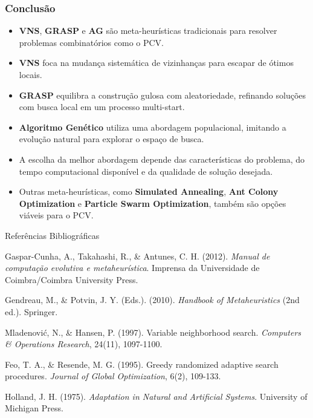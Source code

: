\documentclass{beamer}
\begin{document}
\begin{frame}
  \frametitle{Conclusão}
  
  \begin{itemize}
    \item \textbf{VNS}, \textbf{GRASP} e \textbf{AG} são meta-heurísticas tradicionais para resolver problemas combinatórios como o PCV.
    \item \textbf{VNS} foca na mudança sistemática de vizinhanças para escapar de ótimos locais.
    \item \textbf{GRASP} equilibra a construção gulosa com aleatoriedade, refinando soluções com busca local em um processo multi-start.
    \item \textbf{Algoritmo Genético} utiliza uma abordagem populacional, imitando a evolução natural para explorar o espaço de busca.
    \item A escolha da melhor abordagem depende das características do problema, do tempo computacional disponível e da qualidade de solução desejada.
    \item Outras meta-heurísticas, como \textbf{Simulated Annealing}, \textbf{Ant Colony Optimization} e \textbf{Particle Swarm Optimization}, também são opções viáveis para o PCV.
  \end{itemize}
  
\end{frame}


\begin{frame}{Referências Bibliográficas}
    \begin{thebibliography}{99}

    Gaspar-Cunha, A., Takahashi, R., \& Antunes, C. H. (2012). 
    \textit{Manual de computação evolutiva e metaheurística}. 
    Imprensa da Universidade de Coimbra/Coimbra University Press.

    Gendreau, M., \& Potvin, J. Y. (Eds.). (2010). 
    \textit{Handbook of Metaheuristics} (2nd ed.). 
    Springer.

    Mladenović, N., \& Hansen, P. (1997). 
    Variable neighborhood search. 
    \textit{Computers \& Operations Research}, 24(11), 1097-1100.

    Feo, T. A., \& Resende, M. G. (1995). 
    Greedy randomized adaptive search procedures. 
    \textit{Journal of Global Optimization}, 6(2), 109-133.

    Holland, J. H. (1975). 
    \textit{Adaptation in Natural and Artificial Systems}. 
    University of Michigan Press.

    \end{thebibliography}
\end{frame}
\end{document}
